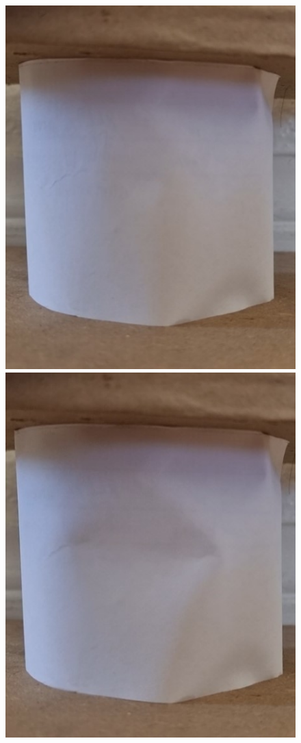 \begin{figure}
\includegraphics[scale=0.42]{figures/Buckling_1.jpg}\quad
\includegraphics[scale=0.436]{figures/Buckling_2.jpg}\quad

\end{figure}
